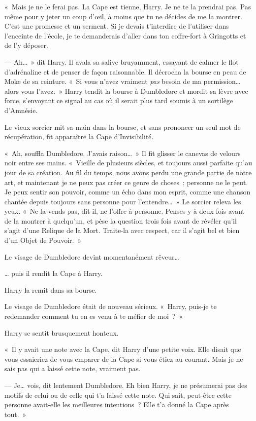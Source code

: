 «~Mais je ne le ferai pas. La Cape est tienne, Harry. Je ne te la prendrai pas. Pas même pour y jeter un coup d'œil, à moins que tu ne décides de me la montrer. C'est une promesse et un serment. Si je devais t'interdire de l'utiliser dans l'enceinte de l'école, je te demanderais d'aller dans ton coffre-fort à Gringotts et de l'y déposer.

--- Ah…~» dit Harry. Il avala sa salive bruyamment, essayant de calmer le flot d'adrénaline et de penser de façon raisonnable. Il décrocha la bourse en peau de Moke de sa ceinture. «~Si vous n'avez vraiment \emph{pas} besoin de ma permission… alors vous l'avez.~» Harry tendit la bourse à Dumbledore et mordit sa lèvre avec force, s'envoyant ce signal au cas où il serait plus tard soumis à un sortilège d'Amnésie.

Le vieux sorcier mit sa main dans la bourse, et sans prononcer un seul mot de récupération, fit apparaître la Cape d'Invisibilité.

«~Ah, souffla Dumbledore. J'avais raison…~» Il fit glisser le canevas de velours noir entre ses mains. «~Vieille de plusieurs siècles, et toujours aussi parfaite qu'au jour de sa création. Au fil du temps, nous avons perdu une grande partie de notre art, et maintenant je ne peux pas créer ce genre de choses~; personne ne le peut. Je peux sentir son pouvoir, comme un écho dans mon esprit, comme une chanson chantée depuis toujours sans personne pour l'entendre…~» Le sorcier releva les yeux. «~Ne la vends pas, dit-il, ne l'offre à personne. Penses-y à deux fois avant de la montrer à quelqu'un, et pèse la question trois fois avant de révéler qu'il s'agit d'une Relique de la Mort. Traite-la avec respect, car il s'agit bel et bien d'un Objet de Pouvoir.~»

Le visage de Dumbledore devint momentanément rêveur…

… puis il rendit la Cape à Harry.

Harry la remit dans sa bourse.

Le visage de Dumbledore était de nouveau sérieux. «~Harry, puis-je te redemander comment tu en es venu à te méfier de moi~?~»

Harry se sentit brusquement honteux.

«~Il y avait une note avec la Cape, dit Harry d'une petite voix. Elle disait que vous essaieriez de vous emparer de la Cape si vous étiez au courant. Mais je ne sais pas qui a laissé cette note, vraiment pas.

--- Je… vois, dit lentement Dumbledore. Eh bien Harry, je ne présumerai pas des motifs de celui ou de celle qui t'a laissé cette note. Qui sait, peut-être cette personne avait-elle les meilleures intentions~? Elle t'a donné la Cape après tout.~»

